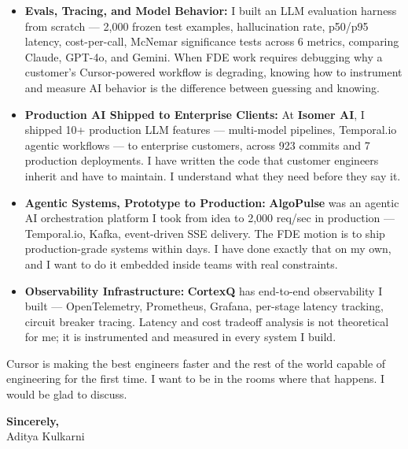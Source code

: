 \documentclass[11pt,letterpaper]{article}
\begin{document}
\begin{itemize}[leftmargin=*, itemsep=3pt, label={\color{CursorPurple}\faAngleRight}]
    \item \textbf{Evals, Tracing, and Model Behavior:} I built an LLM evaluation harness from scratch --- 2,000 frozen test examples, hallucination rate, p50/p95 latency, cost-per-call, McNemar significance tests across 6 metrics, comparing Claude, GPT-4o, and Gemini. When FDE work requires debugging why a customer's Cursor-powered workflow is degrading, knowing how to instrument and measure AI behavior is the difference between guessing and knowing.

    \item \textbf{Production AI Shipped to Enterprise Clients:} At \textbf{Isomer AI}, I shipped 10+ production LLM features --- multi-model pipelines, Temporal.io agentic workflows --- to enterprise customers, across 923 commits and 7 production deployments. I have written the code that customer engineers inherit and have to maintain. I understand what they need before they say it.

    \item \textbf{Agentic Systems, Prototype to Production:} \textbf{AlgoPulse} was an agentic AI orchestration platform I took from idea to 2,000 req/sec in production --- Temporal.io, Kafka, event-driven SSE delivery. The FDE motion is to ship production-grade systems within days. I have done exactly that on my own, and I want to do it embedded inside teams with real constraints.

    \item \textbf{Observability Infrastructure:} \textbf{CortexQ} has end-to-end observability I built --- OpenTelemetry, Prometheus, Grafana, per-stage latency tracking, circuit breaker tracing. Latency and cost tradeoff analysis is not theoretical for me; it is instrumented and measured in every system I build.
\end{itemize}

\vspace{6pt}

Cursor is making the best engineers faster and the rest of the world capable of engineering for the first time. I want to be in the rooms where that happens. I would be glad to discuss.

\vspace{12pt}

\textbf{Sincerely,}\\[8pt]
Aditya Kulkarni
\end{document}
